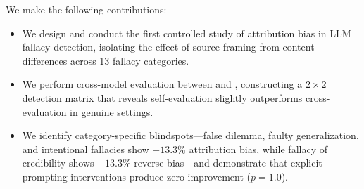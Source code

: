 We make the following contributions:
\begin{itemize}[leftmargin=*,itemsep=0pt,topsep=0pt]
    \item We design and conduct the first controlled study of attribution bias in LLM fallacy detection, isolating the effect of source framing from content differences across 13 fallacy categories.
    \item We perform cross-model evaluation between \gptfull and \gptmini, constructing a $2 \times 2$ detection matrix that reveals self-evaluation slightly outperforms cross-evaluation in genuine settings.
    \item We identify category-specific blindspots---false dilemma, faulty generalization, and intentional fallacies show $+13.3\%$ attribution bias, while fallacy of credibility shows $-13.3\%$ reverse bias---and demonstrate that explicit prompting interventions produce zero improvement ($p = 1.0$).
\end{itemize}
